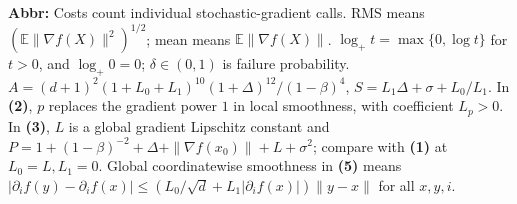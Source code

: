 \begin{table}[tp]
\begin{threeparttable}
\begin{tablenotes}[flushleft]
\item[] \textbf{Abbr:} Costs count individual stochastic-gradient calls. RMS means $(\mathbb E\|\nabla f(X)\|^2)^{1/2}$; mean means $\mathbb E\|\nabla f(X)\|$. $\log_+t=\max\{0,\log t\}$ for $t>0$, and $\log_+0=0$; $\delta\in(0,1)$ is failure probability. $A=(d+1)^2(1+L_0+L_1)^{10}(1+\Delta)^{12}/(1-\beta)^4$, $S=L_1\Delta+\sigma+L_0/L_1$. In \textbf{(2)}, $p$ replaces the gradient power $1$ in local smoothness, with coefficient $L_p>0$. In \textbf{(3)}, $L$ is a global gradient Lipschitz constant and $P=1+(1-\beta)^{-2}+\Delta+\|\nabla f(x_0)\|+L+\sigma^2$; compare with \textbf{(1)} at $L_0=L,L_1=0$. Global coordinatewise smoothness in \textbf{(5)} means $|\partial_i f(y)-\partial_i f(x)|\le(L_0/\sqrt d+L_1|\partial_i f(x)|)\|y-x\|$ for all $x,y,i$.
\end{tablenotes}
\end{threeparttable}
\end{table}
